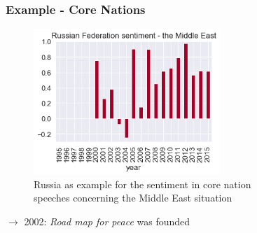 \documentclass{beamer}
\begin{document}
\subsection{}
\begin{framefont}{\footnotesize}
	\begin{frame}
		\frametitle{Example - Core Nations}
		
		
		
		\begin{figure}
					
					
					\includegraphics[trim={0.3cm 0cm 0cm 0.2cm},clip,width=7cm]{Russian_Federation.png}
					\caption{Russia as example for the sentiment in core nation \\speeches concerning the Middle East situation}
			\end{figure}
			$\longrightarrow$ 2002: \textit{Road map for peace} was founded
	
	\end{frame}
\end{framefont}
\end{document}
